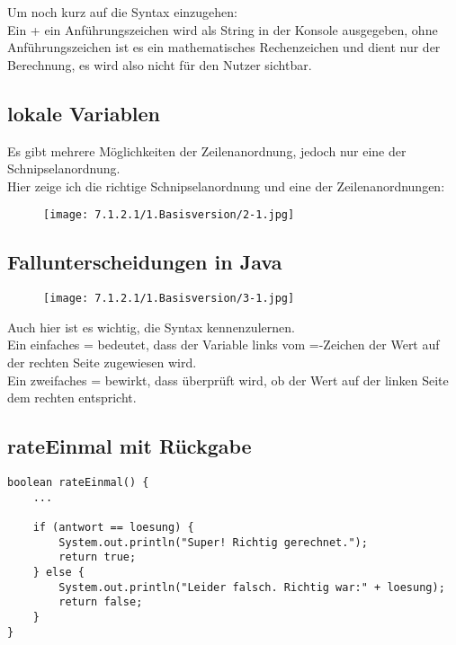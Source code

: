 \documentclass{scrartcl}   %
\begin{document}
Um noch kurz auf die Syntax einzugehen:\\
Ein \glqq +\grqq{} ein Anführungszeichen wird als String in der Konsole ausgegeben, ohne Anführungszeichen ist es ein mathematisches Rechenzeichen und dient nur der Berechnung, es wird also nicht für den Nutzer sichtbar.

\subsection{lokale Variablen}

Es gibt mehrere Möglichkeiten der Zeilenanordnung, jedoch nur eine der Schnipselanordnung.\\
Hier zeige ich die richtige Schnipselanordnung und eine der Zeilenanordnungen:\\

\begin{figure}[ht]
	\centering
	\texttt{[image: 7.1.2.1/1.Basisversion/2-1.jpg]}
\end{figure}

\newpage

\subsection{Fallunterscheidungen in Java}

\begin{figure}[ht]
	\centering
	\texttt{[image: 7.1.2.1/1.Basisversion/3-1.jpg]}
\end{figure}

Auch hier ist es wichtig, die Syntax kennenzulernen.\\
Ein einfaches \glqq =\grqq{} bedeutet, dass der Variable links vom \glqq =\grqq{}-Zeichen der Wert auf der rechten Seite zugewiesen wird.\\
Ein zweifaches \glqq =\grqq{} bewirkt, dass überprüft wird, ob der Wert auf der linken Seite dem rechten entspricht.

\subsection{rateEinmal mit Rückgabe}

\begin{lstlisting}
boolean rateEinmal() {
    ...
    
    if (antwort == loesung) {
        System.out.println("Super! Richtig gerechnet.");
        return true;
    } else {
        System.out.println("Leider falsch. Richtig war:" + loesung);
        return false;
    }
}
\end{lstlisting}
\end{document}

